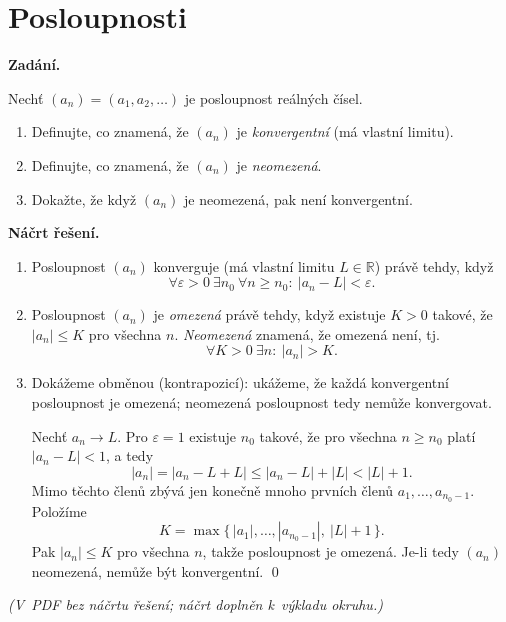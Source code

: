\section{Posloupnosti}

\noindent\textbf{Zadání.}\par
Nechť $(a_n) = (a_1, a_2, \dots)$ je posloupnost reálných čísel.
\begin{enumerate}
  \item Definujte, co znamená, že $(a_n)$ je \emph{konvergentní} (má vlastní limitu).
  \item Definujte, co znamená, že $(a_n)$ je \emph{neomezená}.
  \item Dokažte, že když $(a_n)$ je neomezená, pak není konvergentní.
\end{enumerate}

\medskip
\noindent\textbf{Náčrt řešení.}\par
\begin{enumerate}
  \item Posloupnost $(a_n)$ konverguje (má vlastní limitu $L \in \mathbb{R}$) právě tehdy, když
    \[
      \forall \varepsilon > 0 \ \exists n_0 \ \forall n \geq n_0 : \ |a_n - L| < \varepsilon.
    \]
  \item Posloupnost $(a_n)$ je \emph{omezená} právě tehdy, když existuje $K > 0$ takové, že $|a_n| \leq K$ pro všechna $n$. \emph{Neomezená} znamená, že omezená není, tj.
    \[
      \forall K > 0 \ \exists n : \ |a_n| > K.
    \]
  \item Dokážeme obměnou (kontrapozicí): ukážeme, že každá konvergentní posloupnost je omezená; neomezená posloupnost tedy nemůže konvergovat.

    Nechť $a_n \to L$. Pro $\varepsilon = 1$ existuje $n_0$ takové, že pro všechna $n \geq n_0$ platí $|a_n - L| < 1$, a tedy
    \[
      |a_n| = |a_n - L + L| \leq |a_n - L| + |L| < |L| + 1.
    \]
    Mimo těchto členů zbývá jen konečně mnoho prvních členů $a_1, \dots, a_{n_0 - 1}$. Položíme
    \[
      K = \max\{\, |a_1|, \dots, |a_{n_0 - 1}|,\ |L| + 1 \,\}.
    \]
    Pak $|a_n| \leq K$ pro všechna $n$, takže posloupnost je omezená. Je-li tedy $(a_n)$ neomezená, nemůže být konvergentní. \qed
\end{enumerate}

\medskip
\noindent\textit{(V~PDF bez náčrtu řešení; náčrt doplněn k~výkladu okruhu.)}
